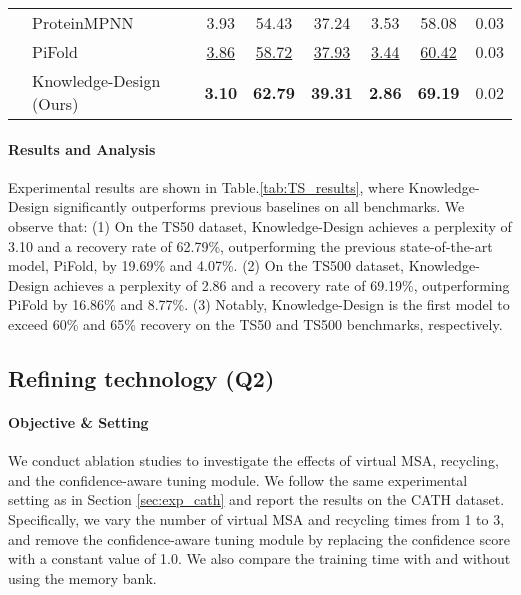 \documentclass{article}
\begin{document}
\begin{table}[h]
{\begin{tabular}{llcccccc}
    & ProteinMPNN            & {3.93}  & {54.43} & {37.24} & {3.53} & {58.08} & 0.03\\
    & PiFold               &   \underline{3.86}             &    \underline{58.72}         &    \underline{37.93}          &   \underline{3.44}        &    \underline{60.42}           &    0.03       \\ 
    & Knowledge-Design (Ours) &   \textbf{3.10}             &    \textbf{62.79}         &    \textbf{39.31}          &   \textbf{2.86}        &    \textbf{69.19}           &    0.02       \\ \hline
   \end{tabular}}
\end{table}

\paragraph{Results and Analysis} Experimental results are shown in Table.\ref{tab:TS_results}, where Knowledge-Design significantly outperforms previous baselines on all benchmarks. We observe that: (1) On the TS50 dataset, Knowledge-Design achieves a perplexity of 3.10 and a recovery rate of 62.79\%, outperforming the previous state-of-the-art model, PiFold, by 19.69\% and 4.07\%. (2) On the TS500 dataset, Knowledge-Design achieves a perplexity of 2.86 and a recovery rate of 69.19\%, outperforming PiFold by 16.86\% and 8.77\%. (3) Notably, Knowledge-Design is the first model to exceed 60\% and 65\% recovery on the TS50 and TS500 benchmarks, respectively.

\subsection{Refining technology (Q2)}
\paragraph{Objective \& Setting}  We conduct ablation studies to investigate the effects of virtual MSA, recycling, and the confidence-aware tuning module. We follow the same experimental setting as in Section \ref{sec:exp_cath} and report the results on the CATH dataset. Specifically, we vary the number of virtual MSA and recycling times from 1 to 3, and remove the confidence-aware tuning module by replacing the confidence score with a constant value of 1.0. We also compare the training time with and without using the memory bank.
\end{document}
